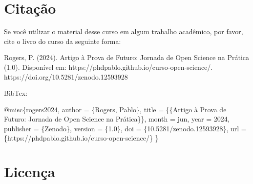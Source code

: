 \documentclass[
  a4paper,
]{book}
\newenvironment{Shaded}{\begin{snugshade}}{\end{snugshade}}
\newcommand{\DecValTok}[1]{\textcolor[rgb]{0.68,0.00,0.00}{#1}}
\newcommand{\ErrorTok}[1]{\textcolor[rgb]{0.68,0.00,0.00}{#1}}
\newcommand{\FloatTok}[1]{\textcolor[rgb]{0.68,0.00,0.00}{#1}}
\newcommand{\NormalTok}[1]{\textcolor[rgb]{0.00,0.23,0.31}{#1}}
\newcommand{\OtherTok}[1]{\textcolor[rgb]{0.00,0.23,0.31}{#1}}
\newcommand{\SpecialCharTok}[1]{\textcolor[rgb]{0.37,0.37,0.37}{#1}}
\begin{document}
\newpage

\section*{Citação}\label{sec-cite}


Se você utilizar o material desse curso em algum trabalho acadêmico, por
favor, cite o livro do curso da seguinte forma:

\begin{tcolorbox}[enhanced jigsaw, breakable, left=2mm, opacityback=0, bottomrule=.15mm, arc=.35mm, colback=white, colframe=quarto-callout-important-color-frame, rightrule=.15mm, toprule=.15mm, leftrule=.75mm]

Rogers, P. (2024). Artigo à Prova de Futuro: Jornada de Open Science na
Prática (1.0). Disponível em:
https://phdpablo.github.io/curso-open-science/.
https://doi.org/10.5281/zenodo.12593928

\end{tcolorbox}

BibTex:

\begin{Shaded}
\begin{Highlighting}[]
\SpecialCharTok{@}\NormalTok{misc\{rogers2024,}
\NormalTok{  author       }\OtherTok{=}\NormalTok{ \{Rogers, Pablo\},}
\NormalTok{  title        }\OtherTok{=}\NormalTok{ \{\{Artigo à Prova de Futuro}\SpecialCharTok{:}\NormalTok{ Jornada de Open Science }
\NormalTok{                   na Prática\}\},}
\NormalTok{  month        }\OtherTok{=}\NormalTok{ jun,}
\NormalTok{  year         }\OtherTok{=} \DecValTok{2024}\NormalTok{,}
\NormalTok{  publisher    }\OtherTok{=}\NormalTok{ \{Zenodo\},}
\NormalTok{  version      }\OtherTok{=}\NormalTok{ \{}\FloatTok{1.0}\NormalTok{\},}
\NormalTok{  doi          }\OtherTok{=}\NormalTok{ \{}\FloatTok{10.5281}\SpecialCharTok{/}\NormalTok{zenodo}\FloatTok{.12593928}\NormalTok{\},}
\NormalTok{  url          }\OtherTok{=}\NormalTok{ \{https}\SpecialCharTok{:}\ErrorTok{//}\NormalTok{phdpablo.github.io}\SpecialCharTok{/}\NormalTok{curso}\SpecialCharTok{{-}}\NormalTok{open}\SpecialCharTok{{-}}\NormalTok{science}\SpecialCharTok{/}\NormalTok{\}}
\NormalTok{\}}
\end{Highlighting}
\end{Shaded}

\section*{Licença}\label{licenuxe7a}
\end{document}
